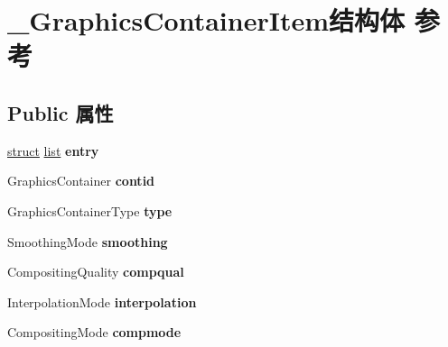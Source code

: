\hypertarget{struct___graphics_container_item}{}\section{\+\_\+\+Graphics\+Container\+Item结构体 参考}
\label{struct___graphics_container_item}
\subsection*{Public 属性}
\begin{DoxyCompactItemize}
\item 
\mbox{\label{struct___graphics_container_item_a056bab41cc684b8b2d5d080fbd42dd48}} 
\hyperlink{interfacestruct}{struct} \hyperlink{classlist}{list} {\bfseries entry}
\item 
\mbox{\label{struct___graphics_container_item_acdb41e7caa995b013c5cfb1ef70ccbd7}} 
Graphics\+Container {\bfseries contid}
\item 
\mbox{\label{struct___graphics_container_item_addfbdd4e096bdd4af2e5446587cd3d0a}} 
Graphics\+Container\+Type {\bfseries type}
\item 
\mbox{\label{struct___graphics_container_item_ab23f3f2aa6cd6ece0bf6900222539eb9}} 
Smoothing\+Mode {\bfseries smoothing}
\item 
\mbox{\label{struct___graphics_container_item_a19d7a6b4aa672a4dbc3a44006ef3457b}} 
Compositing\+Quality {\bfseries compqual}
\item 
\mbox{\label{struct___graphics_container_item_aef69c255fae7ade05fdfc542a0a000eb}} 
Interpolation\+Mode {\bfseries interpolation}
\item 
\mbox{\label{struct___graphics_container_item_aa110806f707ed87b07ade1e5a860f6c8}} 
Compositing\+Mode {\bfseries compmode}
\item 
\mbox{\label{struct___graphics_container_item_a33cdab0538aeafc9ba3eef37187aa3f7}} 

\end{DoxyCompactItemize}
